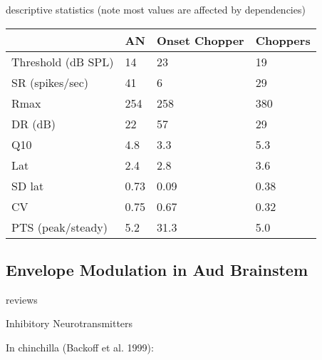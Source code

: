 \documentclass[10pt,a4paper]{article}
\begin{document}
\citep{RhodeSmith:1986} descriptive statistics (note most values are affected by dependencies)

\begin{flushleft}

  \begin{tabularx}{\textwidth}{XXXX}
\toprule
                   &  AN  &  Onset Chopper  & Choppers    \\\midrule
Threshold (dB SPL) &  14  &  23  & 19   \\
SR   (spikes/sec)  &  41  &  6   & 29   \\
       Rmax        & 254  & 258  & 380  \\
     DR (dB)       &  22  &  57  & 29   \\
       Q10         & 4.8  & 3.3  & 5.3  \\
       Lat         & 2.4  & 2.8  & 3.6  \\
      SD lat       & 0.73 & 0.09 & 0.38 \\
        CV         & 0.75 & 0.67 & 0.32 \\
PTS (peak/steady)  & 5.2  & 31.3 & 5.0  \\
\bottomrule
\end{tabularx}
\end{flushleft}

\subsection{Envelope Modulation in Aud Brainstem}
\citep{CondonChangEtAl:1995,FrisinaKarcichEtAl:1996,FrisinaSmithEtAl:1990a,FrisinaSmithEtAl:1990,FrisinaWaltonEtAl:1993,KimSirianniEtAl:1990,Moller:1972,Moller:1976,ReesMoller:1983,ReesMoller:1987,ReesPalmer:1989,Rhode:1998,Rhode:1994,WangSachs:1992,ZhaoLiang:1995,ZhaoLiang:1997}

reviews \citep{Langner:1992,RhodeGreenberg:1994a}

Inhibitory Neurotransmitters
\citep{BackoffPalombiEtAl:1997,Caspary:1990,CasparyBackoffEtAl:1994,CasparyHaveyEtAl:1979,CasparyPazaraEtAl:1987,EbertOstwald:1995,EvansZhao:1993,MartinDicksonEtAl:1982,PalombiCaspary:1992,WickesbergOertel:1990,ZhaoEvans:1990}

In chinchilla (Backoff et al. 1999):
\end{document}
